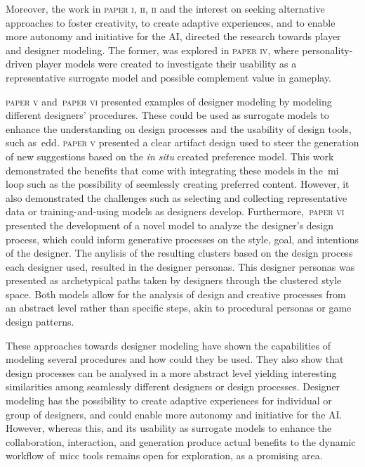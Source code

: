 Moreover, the work in \textsc{paper i, ii, ii} and the interest on seeking alternative approaches to foster creativity, to create adaptive experiences, and to enable more autonomy and initiative for the AI, directed the research towards player and designer modeling. The former, was explored in \textsc{paper iv}, where personality-driven player models were created to investigate their usability as a representative surrogate model and possible complement value in gameplay. 

\textsc{paper v} and~\textsc{paper vi} presented examples of designer modeling by modeling different designers' procedures. These could be used as surrogate models to enhance the understanding on design processes and the usability of design tools, such as~\acrshort{edd}. \textsc{paper v} presented a clear artifact design used to steer the generation of new suggestions based on the \textit{in situ} created preference model. This work demonstrated the benefits that come with integrating these models in the~\acrshort{mi} loop such as the possibility of seemlessly creating preferred content. However, it also demonstrated the challenges such as selecting and collecting representative data or training-and-using models as designers develop. Furthermore,~\textsc{paper vi} presented the development of a novel model to analyze the designer's design process, which could inform generative processes on the style, goal, and intentions of the designer. The anylisis of the resulting clusters based on the design process each designer used, resulted in the designer personas. This designer personas was presented as archetypical paths taken by designers through the clustered style space. Both models allow for the analysis of design and creative processes from an abstract level rather than specific steps, akin to procedural personas or game design patterns. 







These approaches towards designer modeling have shown the capabilities of modeling several procedures and how could they be used. They also show that design processes can be analysed in a more abstract level yielding interesting similarities among seamlessly different designers or design processes. Designer modeling has the possibility to create adaptive experiences for individual or group of designers, and could enable more autonomy and initiative for the AI. However, whereas this, and its usability as surrogate models to enhance the collaboration, interaction, and generation produce actual benefits to the dynamic workflow of~\acrshort{micc} tools remains open for exploration, as a promising area.

